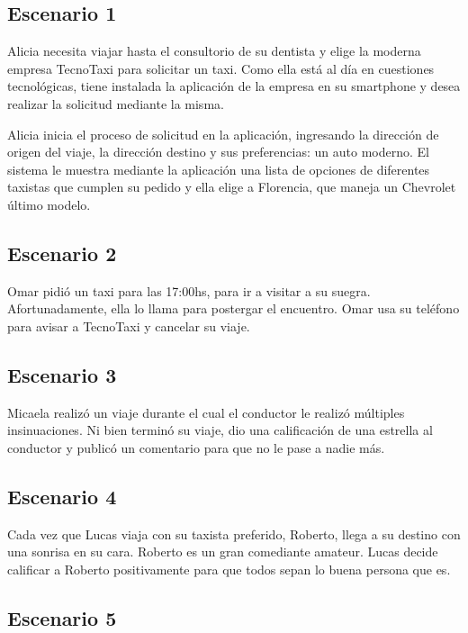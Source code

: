 \documentclass[a4paper, 10pt, twoside]{article}
\begin{document}
\subsection{Escenario 1}

Alicia necesita viajar hasta el consultorio de su dentista y elige la moderna empresa TecnoTaxi para solicitar un taxi. Como ella está al día en cuestiones tecnológicas, tiene instalada la aplicación de la empresa en su smartphone y desea realizar la solicitud mediante la misma.

Alicia inicia el proceso de solicitud en la aplicación, ingresando la dirección de origen del viaje, la dirección destino y sus preferencias: un auto moderno. El sistema le muestra mediante la aplicación una lista de opciones de diferentes taxistas que cumplen su pedido y ella elige a Florencia, que maneja un Chevrolet último modelo.

\subsection{Escenario 2}

Omar pidió un taxi para las 17:00hs, para ir a visitar a su suegra. Afortunadamente, ella lo llama para postergar el encuentro. Omar usa su teléfono para avisar a TecnoTaxi y cancelar su viaje.

\subsection{Escenario 3}

Micaela realizó un viaje durante el cual el conductor le realizó múltiples insinuaciones. Ni bien terminó su viaje, dio una calificación de una estrella al conductor y publicó un comentario para que no le pase a nadie más.

\subsection{Escenario 4}

Cada vez que Lucas viaja con su taxista preferido, Roberto, llega a su destino con una sonrisa en su cara. Roberto es un gran comediante amateur. Lucas decide calificar a Roberto positivamente para que todos sepan lo buena persona que es.

\subsection{Escenario 5}
\end{document}

